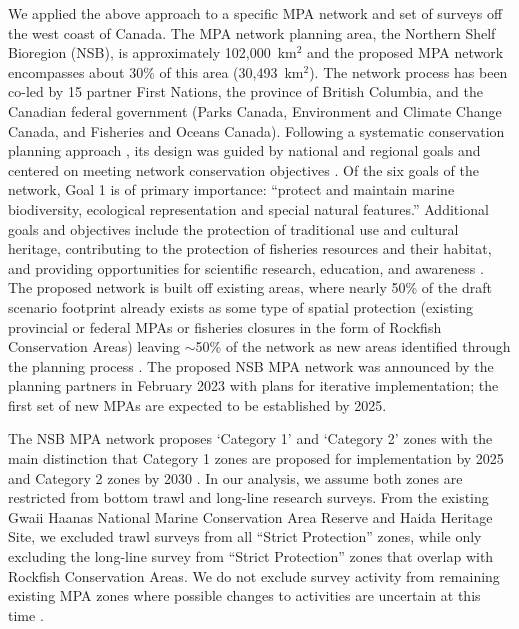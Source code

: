 \documentclass[12pt]{article}
\begin{document}
We applied the above approach to a specific MPA network and set of surveys off the west coast of Canada.
The MPA network planning area, the Northern Shelf Bioregion (NSB), is approximately 102,000~km$^2$ and the proposed MPA network encompasses about 30\% of this area (30,493~km$^2$).
The network process has been co-led by 15 partner First Nations, the province of British Columbia, and the Canadian federal government (Parks Canada, Environment and Climate Change Canada, and Fisheries and Oceans Canada). 
Following a systematic conservation planning approach \citep{margules2000}, its design was guided by national and regional goals \citep{canada2011, canada2014} and centered on meeting network conservation objectives \citep{dfo2022networkactionplan}.
Of the six goals of the network, Goal 1 is of primary importance: ``protect and maintain marine biodiversity, ecological representation and special natural features.''
Additional goals and objectives include the protection of traditional use and cultural heritage, contributing to the protection of fisheries resources and their habitat, and providing opportunities for scientific research, education, and awareness \citep{canada2014}.
The proposed network is built off existing areas, where nearly 50\% of the draft scenario footprint already exists as some type of spatial protection (existing provincial or federal MPAs or fisheries closures in the form of Rockfish Conservation Areas) leaving $\sim$50\% of the network as new areas identified through the planning process \citep{dfo2022networkactionplan}.
The proposed NSB MPA network was announced by the planning partners in February 2023 with plans for iterative implementation; the first set of new MPAs are expected to be established by 2025.

The NSB MPA network proposes `Category 1' and `Category 2' zones with the main distinction that Category 1 zones are proposed for implementation by 2025 and Category 2 zones by 2030 \citep{dfo2022networkactionplan}. 
In our analysis, we assume both zones are restricted from bottom trawl and long-line research surveys. 
From the existing Gwaii Haanas National Marine Conservation Area Reserve and Haida Heritage Site, we excluded trawl surveys from all ``Strict Protection'' zones, while only excluding the long-line survey from ``Strict Protection'' zones that overlap with Rockfish Conservation Areas. We do not exclude survey activity from remaining existing MPA zones where possible changes to activities are uncertain at this time \citep{dfo2022networkactionplan}.
\end{document}
